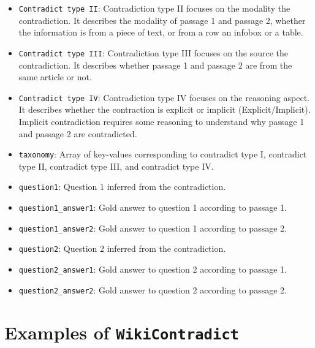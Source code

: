 \documentclass{article}
\begin{document}
\begin{itemize}
\begin{itemize}
        \item \texttt{Contradict type II}: Contradiction type II focuses on the modality the contradiction.  It describes the modality of passage 1 and passage 2, whether the information is from a piece of text, or from a row an infobox or a table. 
        \item \texttt{Contradict type III}: Contradiction type III focuses on the source the contradiction.  It describes whether passage 1 and passage 2 are from the same article or not. 
        \item \texttt{Contradict type IV}: Contradiction type IV focuses on the reasoning aspect.  It describes whether the contraction is explicit or implicit (Explicit/Implicit). Implicit contradiction requires some reasoning to understand why passage 1 and passage 2 are contradicted. 
        \item \texttt{taxonomy}: Array of key-values corresponding to contradict type I, contradict type II, contradict type III, and contradict type IV. 
        \item \texttt{question1}: Question 1 inferred from the contradiction.
        \item \texttt{question1\_answer1}: Gold answer to question 1 according to passage 1.
        \item \texttt{question1\_answer2}: Gold answer to question 1 according to passage 2.
                \item \texttt{question2}: Question 2 inferred from the contradiction.
        \item \texttt{question2\_answer1}: Gold answer to question 2 according to passage 1.
        \item \texttt{question2\_answer2}: Gold answer to question 2 according to passage 2.    
    \end{itemize}
\end{itemize}

\section{Examples of \texttt{WikiContradict}}

\label{appx:examples}
\end{document}
